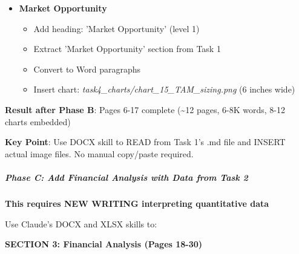 \documentclass[11pt]{article}
\begin{document}
\begin{itemize}[leftmargin=*,itemsep=2pt,topsep=2pt]
\item {} \textbf{Market Opportunity}
\begin{itemize}[leftmargin=*,itemsep=2pt,topsep=2pt]
\item {} Add heading: 'Market Opportunity' (level 1)
\item {} Extract 'Market Opportunity' section from Task 1
\item {} Convert to Word paragraphs
\item {} Insert chart: \emph{task4\_\allowbreak{}charts/chart\_\allowbreak{}15\_\allowbreak{}TAM\_\allowbreak{}sizing.png} (6 inches wide)
\end{itemize}
\end{itemize}

\textbf{Result after Phase B}: Pages 6-17 complete (\textasciitilde{}12 pages, 6-8K words, 8-12 charts embedded)


\textbf{Key Point}: Use DOCX skill to READ from Task 1's .md file and INSERT actual image files. No manual copy/paste required.


\subparagraph{Phase C: Add Financial Analysis with Data from Task 2}\mbox{}\par
\textbf{This requires NEW WRITING interpreting quantitative data}


Use Claude's DOCX and XLSX skills to:


\textbf{SECTION 3: Financial Analysis (Pages 18-30)}
\end{document}
